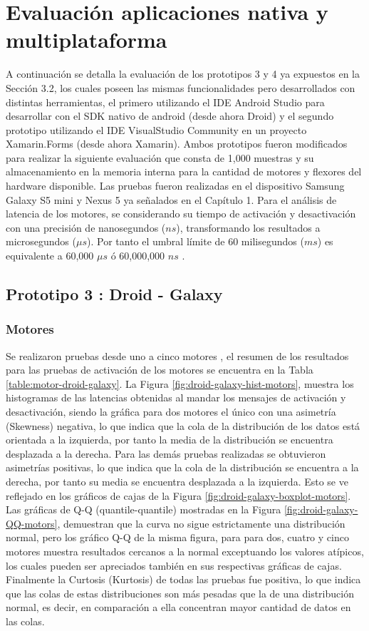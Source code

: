 \section{Evaluación aplicaciones nativa y multiplataforma}

A continuación se detalla la evaluación de los prototipos 3 y 4 ya expuestos en la Sección 3.2, los cuales poseen las mismas funcionalidades pero desarrollados con distintas herramientas, el primero utilizando el IDE Android Studio para desarrollar con el SDK nativo de android (desde ahora Droid) y el segundo prototipo utilizando el IDE VisualStudio Community en un proyecto Xamarin.Forms (desde ahora Xamarin). Ambos prototipos fueron modificados para realizar la siguiente evaluación que consta de 1,000 muestras y su almacenamiento en la memoria interna para la cantidad de motores y flexores del hardware disponible. Las pruebas fueron realizadas en el dispositivo Samsung Galaxy S5 mini y Nexus 5 ya señalados en el Capítulo 1. Para el análisis de latencia de los motores, se considerando su tiempo de activación y desactivación con una precisión de nanosegundos ($ns$), transformando los resultados a microsegundos ($\mu s$).  Por tanto el umbral límite de 60 milisegundos ($ms$) es equivalente a 60,000 $\mu s$ ó 60,000,000 $ns$ .

\subsection{Prototipo 3 : Droid - Galaxy}

\subsubsection{Motores}

Se realizaron pruebas desde uno a cinco motores , el resumen de los resultados para las pruebas de activación de los motores se encuentra en la Tabla \ref{table:motor-droid-galaxy}. La Figura \ref{fig:droid-galaxy-hist-motors}, muestra los histogramas de las latencias obtenidas al mandar los mensajes de activación y desactivación, siendo la gráfica para dos motores el único con una asimetría (Skewness) negativa, lo que indica que la cola de la distribución de los datos está orientada a la izquierda, por tanto la media de la distribución se encuentra desplazada a la derecha. Para las demás pruebas realizadas se obtuvieron asimetrías positivas, lo que indica que la cola de la distribución se encuentra a la derecha, por tanto su media se encuentra desplazada a la izquierda. Esto se ve reflejado en los gráficos de cajas de la Figura \ref{fig:droid-galaxy-boxplot-motors}. Las gráficas de Q-Q (quantile-quantile) mostradas en la Figura \ref{fig:droid-galaxy-QQ-motors}, demuestran que la curva no sigue estrictamente una distribución normal, pero los gráfico Q-Q de la misma figura, para para dos, cuatro y cinco motores muestra resultados cercanos a la normal exceptuando los valores atípicos, los cuales pueden ser apreciados también en sus respectivas gráficas de cajas. Finalmente la Curtosis (Kurtosis) de todas las pruebas fue positiva, lo que indica que las colas de estas distribuciones son más pesadas que la de una distribución normal, es decir, en comparación a ella concentran mayor cantidad de datos en las colas.

